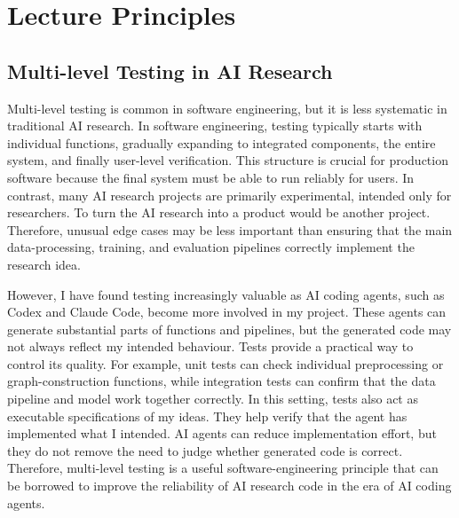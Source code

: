 \section{Lecture Principles}

\subsection{Multi-level Testing in AI Research}

Multi-level testing is common in software engineering, but it is less systematic in traditional AI research. In software engineering, testing typically starts with individual functions, gradually expanding to integrated components, the entire system, and finally user-level verification. This structure is crucial for production software because the final system must be able to run reliably for users. In contrast, many AI research projects are primarily experimental, intended only for researchers. To turn the AI research into a product would be another project. Therefore, unusual edge cases may be less important than ensuring that the main data-processing, training, and evaluation pipelines correctly implement the research idea.

However, I have found testing increasingly valuable as AI coding agents, such as Codex and Claude Code, become more involved in my project. These agents can generate substantial parts of functions and pipelines, but the generated code may not always reflect my intended behaviour. Tests provide a practical way to control its quality. For example, unit tests can check individual preprocessing or graph-construction functions, while integration tests can confirm that the data pipeline and model work together correctly. In this setting, tests also act as executable specifications of my ideas. They help verify that the agent has implemented what I intended. AI agents can reduce implementation effort, but they do not remove the need to judge whether generated code is correct. Therefore, multi-level testing is a useful software-engineering principle that can be borrowed to improve the reliability of AI research code in the era of AI coding agents.


